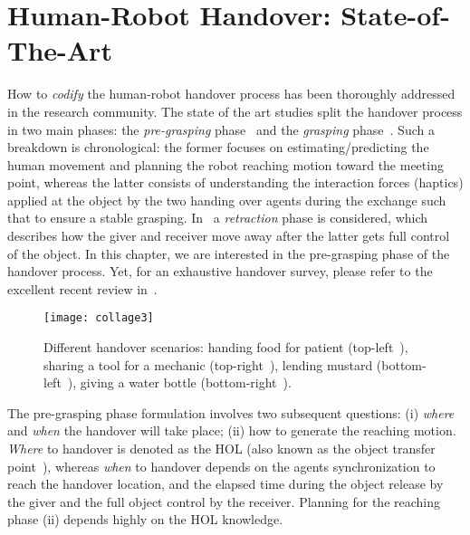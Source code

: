 \section{Human-Robot Handover: State-of-The-Art}\label{sec-chap4:sota}
How to \emph{codify} the human-robot handover process has been thoroughly addressed in the research community. The state of the art studies split the handover process in two main phases: the \emph{pre-grasping} phase~\cite{shibata1995roman,waldhart2015iros,mainprice2021roman,huber2008roman,shi2013rss,koene2014roman,remazeilles2015rss} and the \emph{grasping} phase~\cite{nagata1998icra,chan2013ijrr,medina2016humanoids,solak2019iros,costanzo2021frontiersRob-AI}.
Such a breakdown is chronological: the former focuses on estimating/predicting the human movement and planning the robot reaching motion toward the meeting point, whereas the latter consists of understanding the interaction forces (haptics) applied at the object by the two handing over agents during the exchange such that to ensure a stable grasping. In~\cite{medina2016humanoids} a \emph{retraction} phase is considered, which describes how the giver and receiver move away after the latter gets full control of the object. In this chapter, we are interested in the pre-grasping phase of the handover process. Yet, for an exhaustive handover survey, please refer to the excellent recent review in~\cite{ortenzi2021tro}.  

\begin{figure}
	\centering
	\texttt{[image: collage3]}
	\caption{Different handover scenarios: handing food for patient (top-left~\cite{nemlekar2019icra}), sharing a tool for a mechanic (top-right~\cite{prada2014iros}), lending mustard (bottom-left~\cite{ortenzi2021tro}), giving a water bottle (bottom-right~\cite{medina2016humanoids}).}
	\label{fig:handover examples}
\end{figure}

The pre-grasping phase formulation involves two subsequent questions: (i) \emph{where} and \emph{when} the handover will take place; (ii) how to generate the reaching motion.  \emph{Where} to handover is denoted as the HOL (also known as the object transfer point~\cite{li2015rss,nemlekar2019icra}), whereas \emph{when} to handover depends on the agents synchronization to reach the handover location, and the elapsed time during the object release by the giver and the full object control by the receiver. Planning for the reaching phase (ii) depends highly on the HOL knowledge. 

